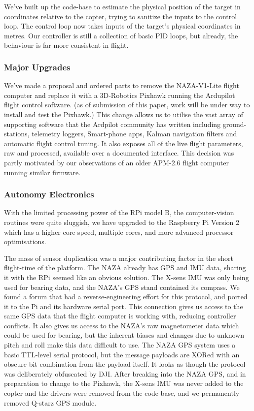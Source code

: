 \documentclass[a4paper, 11pt, titlepage]{article}
\begin{document}
      We've built up the code-base to estimate the physical position of the target in coordinates relative to the copter, trying to sanitize the inputs to the control loop. The control loop now takes inputs of the target's physical coordinates in metres.  Our controller is still a collection of basic PID loops, but already, the behaviour is far more consistent in flight.

    \subsubsection{Major Upgrades}
      We've made a proposal and ordered parts to remove the NAZA-V1-Lite flight computer and replace it with a 3D-Robotics Pixhawk \cite{3dr-pixhawk} running the Ardupilot flight control software.  (as of submission of this paper, work will be under way to install and test the Pixhawk.)
      This change allows us to utilise the vast array of supporting software that the Ardpilot community has written including ground-stations, telemetry loggers, Smart-phone apps, Kalman navigation filters and automatic flight control tuning.  It also exposes all of the live flight parameters, raw and processed, available over a documented interface.  This decision was partly motivated by our observations of an older APM-2.6 flight computer running similar firmware.

    \subsubsection{Autonomy Electronics}
      With the limited processing power of the RPi model B, the computer-vision routines were quite sluggish, we have upgraded to the Raspberry Pi Version 2 which has a higher core speed, multiple cores, and more advanced processor optimisations.

      The mass of sensor duplication was a major contributing factor in the short flight-time of the platform.  The NAZA already has GPS and IMU data, sharing it with the RPi seemed like an obvious solution.  The X-sens IMU was only being used for bearing data, and the NAZA's GPS stand contained its compass.
      We found a forum that had a reverse-engineering effort for this protocol\cite{NAZArev}, and ported it to the Pi and its hardware serial port.  This connection gives us access to the same GPS data that the flight computer is working with, reducing controller conflicts. It also gives us access to the NAZA's raw magnetometer data which could be used for bearing, but the inherent biases and changes due to unknown pitch and roll make this data difficult to use.
      The NAZA GPS system uses a basic TTL-level serial protocol, but the message payloads are XORed with an obscure bit combination from the payload itself.  It looks as though the protocol was deliberately obfuscated by DJI.
      After breaking into the NAZA GPS, and in preparation to change to the Pixhawk, the X-sens IMU was never added to the copter and the drivers were removed from the code-base, and we permanently removed Q-starz GPS module.
      
\end{document}
